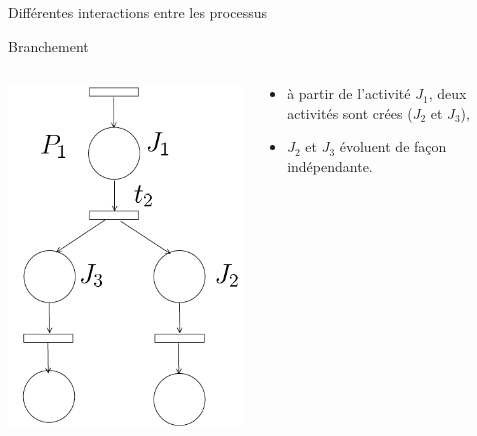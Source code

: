 \documentclass[compress]{beamer}
\begin{document}
\begin{frame}{Différentes interactions entre les processus}
\begin{block}{Branchement}
\begin{columns}
	\begin{column}{.3\linewidth}
		\begin{center}
			\includegraphics[width=\linewidth]{div}
		\end{center}
	\end{column}
	\begin{column}{.7\linewidth}
		\begin{itemize}
		\item à partir de l'activité $J_1$, deux activités sont crées ($J_2$ et $J_3$),
		\item $J_2$ et  $J_3$ évoluent de façon indépendante.
		\end{itemize} 
	\end{column}
\end{columns}
\end{block}
\end{frame}
\end{document}
